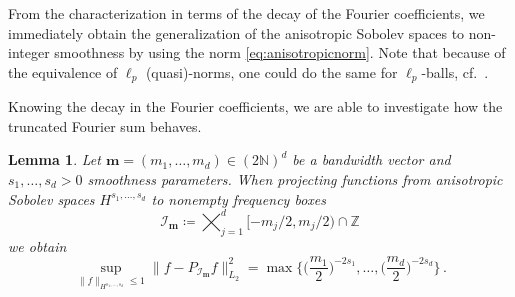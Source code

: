 \documentclass[a4paper]{scrartcl}
\numberwithin{equation}{section}
\newtheorem{lemma}[theorem]{Lemma}
\begin{document}
From the characterization in terms of the decay of the Fourier coefficients, we immediately obtain the generalization of the anisotropic Sobolev spaces to non-integer smoothness  by using the norm \eqref{eq:anisotropicnorm}.
Note that because of the equivalence of $\ell_p$ (quasi)-norms, one could do the same for $\ell_p$-balls, cf.\ \cite[Section~3.6.1]{Barteldiss}.

Knowing the decay in the Fourier coefficients, we are able to investigate how the truncated Fourier sum behaves.

\begin{lemma}\label{boxprojection} Let $\bm m = (m_1, \dots, m_d)\in(2\mathds N)^d$ be a bandwidth vector and $s_1,\dots,s_d>0$ smoothness parameters.
    When projecting functions from anisotropic Sobolev spaces $H^{s_1,\dots,s_d}$ to nonempty frequency boxes
    \begin{equation*}
        \mathcal I_{\bm m}
        \coloneqq \bigtimes_{j=1}^{d}  [-m_j/2, m_j/2) \cap \mathds Z
    \end{equation*}
    we obtain
    \begin{equation*}
        \sup_{\|f\|_{H^{s_1, \dots, s_d}}\le 1} \|f-P_{\mathcal I_{\bm m}}f\|_{L_2}^{2}
        = \max \Big\{\Big(\frac{m_1}{2}\Big)^{-2s_1}, \dots, \Big(\frac{m_d}{2}\Big)^{-2s_d}\Big\} \,.
    \end{equation*}
\end{lemma} 
\end{document}
